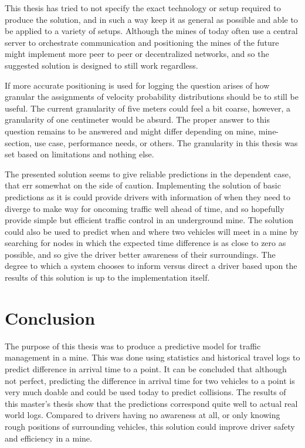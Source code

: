 \documentclass{article}
\begin{document}
		This thesis has tried to not specify the exact technology or setup required to produce the solution, and in such a way keep it as general as possible and able to be applied to a variety of setups. Although the mines of today often use a central server to orchestrate communication and positioning the mines of the future might implement more peer to peer or decentralized networks, and so the suggested solution is designed to still work regardless.

		If more accurate positioning is used for logging the question arises of how granular the assignments of velocity probability distributions should be to still be useful. The current granularity of five meters could feel a bit coarse, however, a granularity of one centimeter would be absurd. The proper answer to this question remains to be answered and might differ depending on mine, mine-section, use case, performance needs, or others. The granularity in this thesis was set based on limitations and nothing else.

		The presented solution seems to give reliable predictions in the dependent case, that err somewhat on the side of caution. Implementing the solution of basic predictions as it is could provide drivers with information of when they need to diverge to make way for oncoming traffic well ahead of time, and so hopefully provide simple but efficient traffic control in an underground mine. The solution could also be used to predict when and where two vehicles will meet in a mine by searching for nodes in which the expected time difference is as close to zero as possible, and so give the driver better awareness of their surroundings. The degree to which a system chooses to inform versus direct a driver based upon the results of this solution is up to the implementation itself.

    \section{Conclusion}
		The purpose of this thesis was to produce a predictive model for traffic management in a mine. This was done using statistics and historical travel logs to predict difference in arrival time to a point. It can be concluded that although not perfect, predicting the difference in arrival time for two vehicles to a point is very much doable and could be used today to predict collisions. The results of this master's thesis show that the predictions correspond quite well to actual real world logs. Compared to drivers having no awareness at all, or only knowing rough positions of surrounding vehicles, this solution could improve driver safety and efficiency in a mine.
\end{document}
